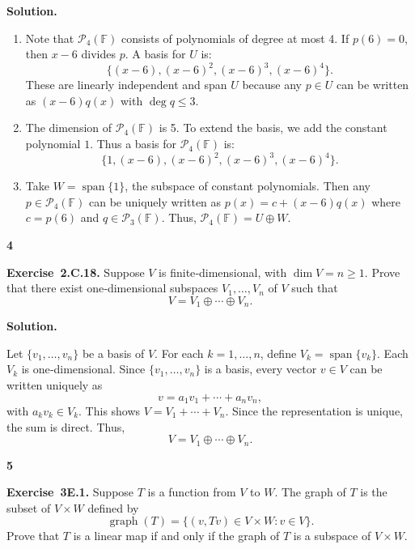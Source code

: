\documentclass[11pt]{article}
\newcommand{\ProblemDivider}[1]{%
  \vspace{1.0em}
  \noindent\textbf{#1}\par
  \vspace{0.35em}
}
\newcommand{\ProblemAnnounce}{\noindent}
\newcommand{\SolutionAnnounce}{\noindent\textbf{Solution.}\par\medskip}
\newcommand{\Exercise}[1]{\textbf{Exercise~#1.}\;}
\newcommand{\F}{\mathbb{F}}
\newcommand{\Pcal}{\mathcal{P}}
\begin{document}
\begin{solutionBox}
\SolutionAnnounce
\doublespacing

\begin{enumerate}
  \item[(a)] Note that $\Pcal_4(\F)$ consists of polynomials of degree at most 4. If $p(6)=0$, then $x-6$ divides $p$. A basis for $U$ is:
  \[
  \{(x-6), (x-6)^2, (x-6)^3, (x-6)^4\}.
  \]
  These are linearly independent and span $U$ because any $p \in U$ can be written as $(x-6)q(x)$ with $\deg q \leq 3$. 
  
  \item[(b)] The dimension of $\Pcal_4(\F)$ is 5. To extend the basis, we add the constant polynomial $1$. Thus a basis for $\Pcal_4(\F)$ is:
  \[
  \{1, (x-6), (x-6)^2, (x-6)^3, (x-6)^4\}.
  \]
  
  \item[(c)] Take $W = \operatorname{span}\{1\}$, the subspace of constant polynomials. Then any $p \in \Pcal_4(\F)$ can be uniquely written as $p(x) = c + (x-6)q(x)$ where $c = p(6)$ and $q \in \Pcal_3(\F)$. Thus, $\Pcal_4(\F) = U \oplus W$.
\end{enumerate}
\end{solutionBox}

\ProblemDivider{4}

\begin{problemBox}
\ProblemAnnounce
\Exercise{2.C.18}
Suppose $V$ is finite‑dimensional, with $\dim V = n \geq 1$. Prove that there exist one‑dimensional subspaces $V_1, \dots, V_n$ of $V$ such that
\[
V = V_1 \oplus \cdots \oplus V_n.
\]
\end{problemBox}

\begin{solutionBox}
\SolutionAnnounce
\doublespacing

Let $\{v_1, \dots, v_n\}$ be a basis of $V$. For each $k = 1,\dots,n$, define $V_k = \operatorname{span}\{v_k\}$. Each $V_k$ is one‑dimensional. Since $\{v_1,\dots,v_n\}$ is a basis, every vector $v \in V$ can be written uniquely as
\[
v = a_1 v_1 + \cdots + a_n v_n,
\]
with $a_k v_k \in V_k$. This shows $V = V_1 + \cdots + V_n$. Since the representation is unique, the sum is direct. Thus,
\[
V = V_1 \oplus \cdots \oplus V_n.
\]
\end{solutionBox}

\ProblemDivider{5}

\begin{problemBox}
\ProblemAnnounce
\Exercise{3E.1}
Suppose $T$ is a function from $V$ to $W$. The graph of $T$ is the subset of $V \times W$ defined by
\[
\operatorname{graph}(T) = \{(v, Tv) \in V \times W : v \in V\}.
\]
Prove that $T$ is a linear map if and only if the graph of $T$ is a subspace of $V \times W$.
\end{problemBox}
\end{document}
